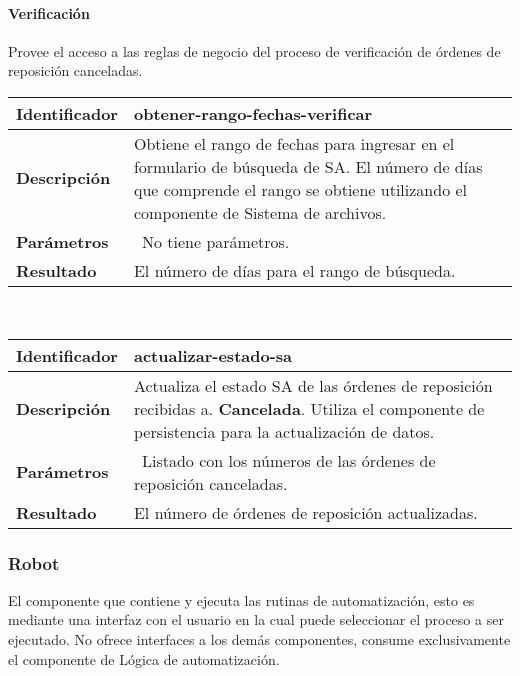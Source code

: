 \paragraph{Verificación\\}
Provee el acceso a las reglas de negocio del proceso de verificación de órdenes de reposición canceladas.
	\vspace{5mm}\\
	\begin{tabular}{|p{}|p{}|}
		\hline
		\textbf{Identificador}	& \textbf{obtener-rango-fechas-verificar}\\
		\hline
		\hline
		\textbf{Descripción}	& Obtiene el rango de fechas para ingresar en el formulario de búsqueda de SA. El número de días que comprende el rango se obtiene utilizando el componente de Sistema de archivos.\\
		\hline
		\textbf{Parámetros}		& \textbullet\, No tiene parámetros.\\
		\hline
		\textbf{Resultado}		& El número de días para el rango de búsqueda.\\
		\hline
	\end{tabular}
	\vspace{5mm}\\
	\begin{tabular}{|p{}|p{}|}
		\hline
		\textbf{Identificador}	& \textbf{actualizar-estado-sa}\\
		\hline
		\hline
		\textbf{Descripción}	& Actualiza el estado SA de las órdenes de reposición recibidas a. \textbf{Cancelada}. Utiliza el componente de persistencia para la actualización de datos.\\
		\hline
		\textbf{Parámetros}		& \textbullet\, Listado con los números de las órdenes de reposición canceladas.\\
		\hline
		\textbf{Resultado}		& El número de órdenes de reposición actualizadas.\\
		\hline
	\end{tabular}
	\vspace{5mm}

\subsubsection{Robot}
El componente que contiene y ejecuta las rutinas de automatización, esto es mediante una interfaz con el usuario en la cual puede seleccionar el proceso a ser ejecutado. No ofrece interfaces a los demás componentes, consume exclusivamente el componente de Lógica de automatización.\\


